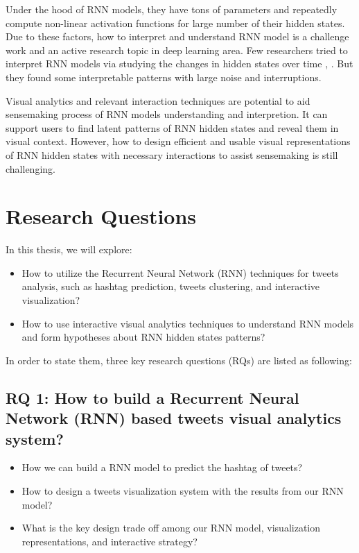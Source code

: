 Under the hood of RNN models, they have tons of parameters and repeatedly compute non-linear activation functions for large number of their hidden states. Due to these factors, how to interpret and understand RNN model is a challenge work and an active research topic in deep learning area. Few researchers tried to interpret RNN models via studying the changes in hidden states over time \cite{Strobelt2016} \cite{Li2016}, . But they found some interpretable patterns with large noise and interruptions. 

Visual analytics and relevant interaction techniques are potential to aid sensemaking process \cite{Pirolli2005} of RNN models understanding and interpretion. It can support users to find latent patterns of RNN hidden states and reveal them in visual context. However, how to design efficient and usable visual representations of RNN hidden states with necessary interactions to assist sensemaking is still challenging.

\section{Research Questions}

In this thesis, we will explore:

\begin{itemize}
    \item How to utilize the Recurrent Neural Network (RNN) techniques for tweets analysis, such as hashtag prediction, tweets clustering, and interactive visualization?
    \item How to use interactive visual analytics techniques to understand RNN models and form hypotheses about RNN hidden states patterns?
\end{itemize}


In order to state them, three key research questions (RQs) are listed as following: 

\subsection{RQ 1: How to build a Recurrent Neural Network (RNN) based tweets visual analytics system?}

\begin{itemize}
    \item How we can build a RNN model to predict the hashtag of tweets?
    
    \item How to design a tweets visualization system with the results from our RNN model? 
    
    \item What is the key design trade off among our RNN model, visualization representations, and interactive strategy?
\end{itemize}

